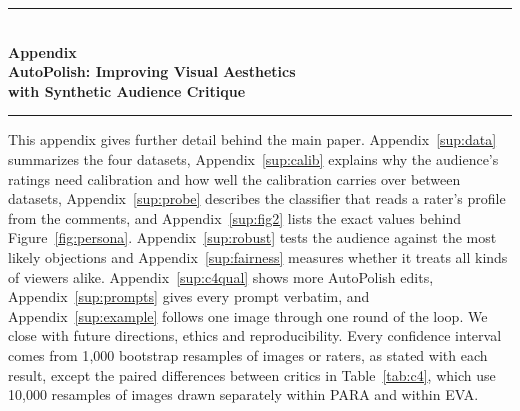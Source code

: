 \documentclass[runningheads]{llncs}
\begin{document}






\ifdefined\mainonly\else
\newpage
\begin{center}
  \rule{\textwidth}{4pt}\\[0.16in]
  {\bfseries\fontsize{14}{17}\selectfont Appendix\\[5pt]}
  {\bfseries\fontsize{17}{21}\selectfont AutoPolish: Improving Visual Aesthetics\\ with Synthetic Audience Critique\\[0.14in]}
  \rule{\textwidth}{1pt}
\end{center}
\vspace{1.1em}

\appendix
\setcounter{section}{0}
\renewcommand{\thesection}{A\arabic{section}}
\setcounter{figure}{0}
\renewcommand{\thefigure}{A\arabic{figure}}
\setcounter{table}{0}
\renewcommand{\thetable}{A\arabic{table}}

\suppressfloats[t]

\newcommand{\tstrut}{\rule{0pt}{2.3ex}}
\newcommand{\bstrut}{\rule[-0.7ex]{0pt}{0pt}}

This appendix gives further detail behind the main paper. Appendix~\ref{sup:data} summarizes the four datasets, Appendix~\ref{sup:calib} explains why the audience's ratings need calibration and how well the calibration carries over between datasets, Appendix~\ref{sup:probe} describes the classifier that reads a rater's profile from the comments, and Appendix~\ref{sup:fig2} lists the exact values behind Figure~\ref{fig:persona}. Appendix~\ref{sup:robust} tests the audience against the most likely objections and Appendix~\ref{sup:fairness} measures whether it treats all kinds of viewers alike. Appendix~\ref{sup:c4qual} shows more AutoPolish edits, Appendix~\ref{sup:prompts} gives every prompt verbatim, and Appendix~\ref{sup:example} follows one image through one round of the loop. We close with future directions, ethics and reproducibility. Every confidence interval comes from 1{,}000 bootstrap resamples of images or raters, as stated with each result, except the paired differences between critics in Table~\ref{tab:c4}, which use 10{,}000 resamples of images drawn separately within PARA and within EVA.
\end{document}
